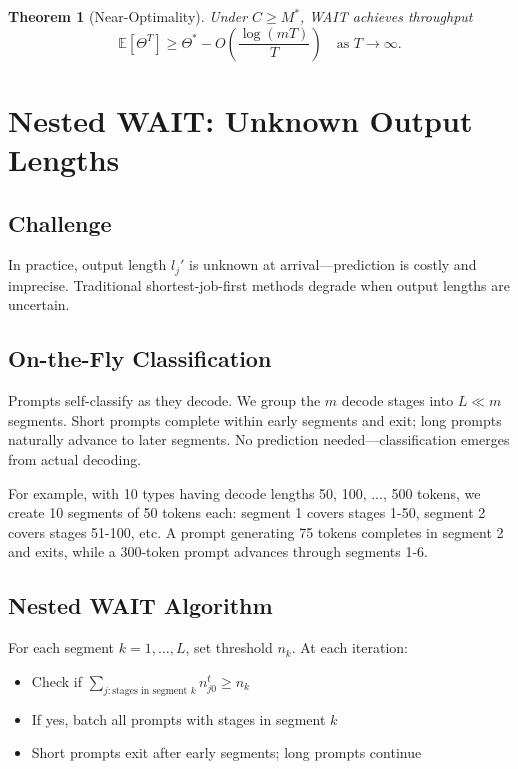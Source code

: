\textbf{Theorem 1} (Near-Optimality). \textit{Under $C \geq M^*$, WAIT achieves throughput}
\begin{equation}
\mathbb{E}[\Theta^T] \geq \Theta^* - O\left(\frac{\log(mT)}{T}\right) \quad \text{as } T \to \infty.
\end{equation}


\section{Nested WAIT: Unknown Output Lengths}

\subsection{Challenge}

In practice, output length $l_j'$ is unknown at arrival—prediction is costly and imprecise. Traditional shortest-job-first methods degrade when output lengths are uncertain.

\subsection{On-the-Fly Classification}

Prompts self-classify as they decode. We group the $m$ decode stages into $L \ll m$ segments. Short prompts complete within early segments and exit; long prompts naturally advance to later segments. No prediction needed—classification emerges from actual decoding.

For example, with 10 types having decode lengths 50, 100, ..., 500 tokens, we create 10 segments of 50 tokens each: segment 1 covers stages 1-50, segment 2 covers stages 51-100, etc. A prompt generating 75 tokens completes in segment 2 and exits, while a 300-token prompt advances through segments 1-6.

\subsection{Nested WAIT Algorithm}

For each segment $k = 1, \dots, L$, set threshold $n_k$. At each iteration:
\begin{itemize}
\item Check if $\sum_{j: \text{stages in segment } k} n_{j0}^t \geq n_k$
\item If yes, batch all prompts with stages in segment $k$
\item Short prompts exit after early segments; long prompts continue
\end{itemize}

